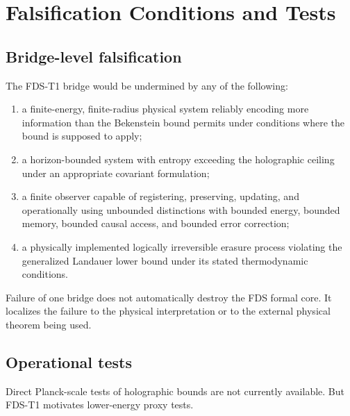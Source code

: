 \documentclass[10pt,a4paper,twocolumn,aps,prl]{revtex4-2}
\begin{document}
\section{Falsification Conditions and Tests}

\subsection{Bridge-level falsification}

The FDS-T1 bridge would be undermined by any of the following:

\begin{enumerate}
    \item a finite-energy, finite-radius physical system reliably encoding more information than the Bekenstein bound permits under conditions where the bound is supposed to apply;
    \item a horizon-bounded system with entropy exceeding the holographic ceiling under an appropriate covariant formulation;
    \item a finite observer capable of registering, preserving, updating, and operationally using unbounded distinctions with bounded energy, bounded memory, bounded causal access, and bounded error correction;
    \item a physically implemented logically irreversible erasure process violating the generalized Landauer lower bound under its stated thermodynamic conditions.
\end{enumerate}

Failure of one bridge does not automatically destroy the FDS formal core. It localizes the failure to the physical interpretation or to the external physical theorem being used.

\subsection{Operational tests}

Direct Planck-scale tests of holographic bounds are not currently available. But FDS-T1 motivates lower-energy proxy tests.
\end{document}
